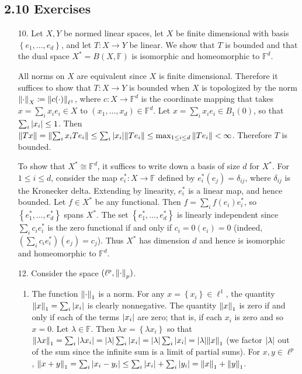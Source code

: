 \documentclass[11pt,leqno]{article}
\theoremstyle{plain}
\theoremstyle{definition}
\numberwithin{equation}{section}
\numberwithin{lem}{section}
\newcommand{\cbr}[1]{\left\{#1\right\}}
\begin{document}
\subsection*{2.10 Exercises}
\begin{enumerate}
  \item[10.] Let $X,Y$ be normed linear spaces, let $X$ be finite dimensional with basis $\cbr{e_1,\dots,e_d}$, and let $T\colon X\to Y$ be linear. We show that $T$ is bounded and that the dual space $X^\ast = B(X,\mathbb F)$ is isomorphic and homeomorphic to $\mathbb F^d$.
  
  All norms on $X$ are equivalent since $X$ is finite dimensional. Therefore it suffices to show that $T\colon X\to Y$ is bounded when $X$ is topologized by the norm $\norm{\cdot}_X\coloneqq \norm{c(\cdot)}_{\ell^1}$, where $c\colon X\to \mathbb F^d$ is the coordinate mapping that takes $x = \sum_ix_ie_i\in X$ to $(x_1,\dots,x_d)\in \mathbb F^d$. Let $x = \sum_i x_ie_i\in B_1(0)$, so that $\sum_i \abs{x_i} \leq 1$. Then $\norm{Tx} = \norm{\sum_i x_iTe_i}\leq \sum_i \abs{x_i} \norm{Te_i}\leq \max_{1\leq i\leq d}\norm{Te_i}< \infty$. Therefore $T$ is bounded.

  To show that $X^\ast\cong \mathbb F^d$, it suffices to write down a basis of size $d$ for $X^\ast$. For $1\leq i\leq d$, consider the map $e_i^\ast\colon X\to \mathbb F$ defined by $e_i^\ast(e_j) = \delta_{ij}$, where $\delta_{ij}$ is the Kronecker delta. Extending by linearity, $e_i^\ast$ is a linear map, and hence bounded. Let $f\in X^\ast$ be any functional. Then $f = \sum_i f(e_i)e_i^\ast$, so $\cbr{e_1^\ast,\dots,e_d^\ast}$ spans $X^\ast$. The set $\cbr{e_1^\ast,\dots,e_d^\ast}$ is linearly independent since $\sum_i c_ie_i^\ast$ is the zero functional if and only if $c_i = 0(e_i) = 0$ (indeed, $(\sum_i c_ie_i^\ast)(e_j) = c_j$). Thus $X^\ast$ has dimension $d$ and hence is isomorphic and homeomorphic to $\mathbb F^d$.
  
  \item[12.] Consider the space $(\ell^p, \norm{\cdot}_p)$.
  \begin{enumerate}
    \item The function $\norm{\cdot}_1$ is a norm. For any $x = \cbr{x_i}\in \ell^1$, the quantity $\norm{x}_1 = \sum_i \abs{x_i}$ is clearly nonnegative. The quantity $\norm{x}_1$ is zero if and only if each of the terms $\abs{x_i}$ are zero; that is, if each $x_i$ is zero and so $x = 0$. Let $\lambda\in \mathbb F$. Then $\lambda x = \cbr{\lambda x_i}$ so that $\norm{\lambda x}_1 = \sum_i \abs{\lambda x_i} = \abs{\lambda}\sum_i \abs{x_i} = \abs{\lambda}\sum_i \abs{x_i} = \abs{\lambda}\norm{x}_1$ (we factor $\abs{\lambda}$ out of the sum since the infinite sum is a limit of partial sums). For $x,y\in \ell^p$, $\norm{x+y}_1 = \sum_i\abs{x_i-y_i}\leq \sum_i \abs{x_i} + \sum_i\abs{y_i} = \norm{x}_1 + \norm{y}_1$.
    

\end{enumerate}
\end{enumerate}
\end{document}
